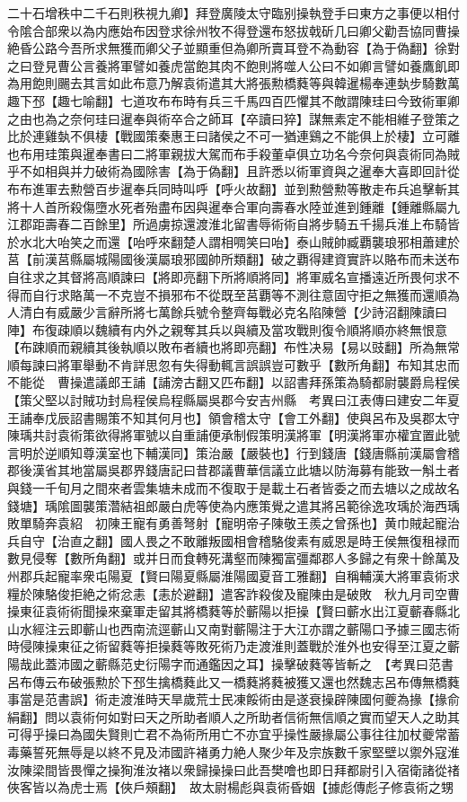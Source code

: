 二十石增秩中二千石則秩視九卿】拜登廣陵太守臨别操執登手曰東方之事便以相付令隂合部衆以為内應始布因登求徐州牧不得登還布怒拔戟斫几曰卿父勸吾協同曹操絶昏公路今吾所求無獲而卿父子並顯重但為卿所賣耳登不為動容【為于偽翻】徐對之曰登見曹公言養將軍譬如養虎當飽其肉不飽則將噬人公曰不如卿言譬如養鷹飢即為用飽則颺去其言如此布意乃解袁術遣其大將張勲橋蕤等與韓暹楊奉連埶步騎數萬趣下邳【趣七喻翻】七道攻布布時有兵三千馬四百匹懼其不敵謂陳珪曰今致術軍卿之由也為之奈何珪曰暹奉與術卒合之師耳【卒讀曰猝】謀無素定不能相維子登策之比於連雞埶不俱棲【戰國策秦惠王曰諸侯之不可一猶連鷄之不能俱上於棲】立可離也布用珪策與暹奉書曰二將軍親拔大駕而布手殺董卓俱立功名今奈何與袁術同為賊乎不如相與并力破術為國除害【為于偽翻】且許悉以術軍資與之暹奉大喜即回計從布布進軍去勲營百步暹奉兵同時叫呼【呼火故翻】並到勲營勲等散走布兵追擊斬其將十人首所殺傷墮水死者殆盡布因與暹奉合軍向壽春水陸並進到鍾離【鍾離縣屬九江郡距壽春二百餘里】所過虜掠還渡淮北留書辱術術自將步騎五千揚兵淮上布騎皆於水北大咍笑之而還【咍呼來翻楚人謂相啁笑曰咍】泰山賊帥臧覇襲琅邪相蕭建於莒【前漢莒縣屬城陽國後漢屬琅邪國帥所類翻】破之覇得建資實許以賂布而未送布自往求之其督將高順諫曰【將即亮翻下所將順將同】將軍威名宣播遠近所畏何求不得而自行求賂萬一不克豈不損邪布不從既至莒覇等不測往意固守拒之無獲而還順為人清白有威嚴少言辭所將七萬餘兵號令整齊每戰必克名陷陳營【少詩沼翻陳讀曰陣】布復疎順以魏續有内外之親奪其兵以與續及當攻戰則復令順將順亦終無恨意【布踈順而親續其後執順以敗布者續也將即亮翻】布性决易【易以豉翻】所為無常順每諫曰將軍舉動不肯詳思忽有失得動輒言誤誤豈可數乎【數所角翻】布知其忠而不能從　曹操遣議郎王誧【誧滂古翻又匹布翻】以詔書拜孫策為騎都尉襲爵烏程侯【策父堅以討賊功封烏程侯烏程縣屬吳郡今安吉州縣　考異曰江表傳曰建安二年夏王誧奉戊辰詔書賜策不知其何月也】領會稽太守【會工外翻】使與呂布及吳郡太守陳瑀共討袁術策欲得將軍號以自重誧便承制假策明漢將軍【明漢將軍亦權宜置此號言明於逆順知尊漢室也下輔漢同】策治嚴【嚴裝也】行到錢唐【錢唐縣前漢屬會稽郡後漢省其地當屬吳郡界錢唐記曰昔郡議曹華信議立此塘以防海募有能致一斛土者與錢一千旬月之間來者雲集塘未成而不復取于是載土石者皆委之而去塘以之成故名錢塘】瑀隂圖襲策濳結祖郎嚴白虎等使為内應策覺之遣其將呂範徐逸攻瑀於海西瑀敗單騎奔袁紹　初陳王寵有勇善弩射【寵明帝子陳敬王羨之曾孫也】黄巾賊起寵治兵自守【治直之翻】國人畏之不敢離叛國相會稽駱俊素有威恩是時王侯無復租禄而數見侵奪【數所角翻】或并日而食轉死溝壑而陳獨富彊鄰郡人多歸之有衆十餘萬及州郡兵起寵率衆屯陽夏【賢曰陽夏縣屬淮陽國夏音工雅翻】自稱輔漢大將軍袁術求糧於陳駱俊拒絶之術忿恚【恚於避翻】遣客詐殺俊及寵陳由是破敗　秋九月司空曹操東征袁術術聞操來棄軍走留其將橋蕤等於蘄陽以拒操【賢曰蘄水出江夏蘄春縣北山水經注云即蘄山也西南流逕蘄山又南對蘄陽注于大江亦謂之蘄陽口予據三國志術時侵陳操東征之術留蕤等拒操蕤等敗死術乃走渡淮則蓋戰於淮外也安得至江夏之蘄陽哉此蓋沛國之蘄縣范史衍陽字而通鑑因之耳】操擊破蕤等皆斬之　【考異曰范書呂布傳云布破張勲於下邳生擒橋蕤此又一橋蕤將蕤被獲又還也然魏志呂布傳無橋蕤事當是范書誤】術走渡淮時天旱歲荒士民凍餒術由是遂衰操辟陳國何夔為掾【掾俞絹翻】問以袁術何如對曰天之所助者順人之所助者信術無信順之實而望天人之助其可得乎操曰為國失賢則亡君不為術所用亡不亦宜乎操性嚴掾屬公事往往加杖夔常蓄毒藥誓死無辱是以終不見及沛國許褚勇力絶人聚少年及宗族數千家堅壁以禦外寇淮汝陳梁間皆畏憚之操狥淮汝褚以衆歸操操曰此吾樊噲也即日拜都尉引入宿衛諸從禇俠客皆以為虎士焉【俠戶頰翻】　故太尉楊彪與袁術昏姻【據彪傳彪子修袁術之甥